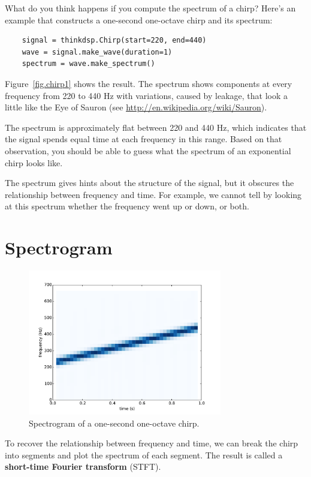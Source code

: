 \documentclass[12pt]{book}
\begin{document}
What do you think happens if you compute the spectrum of a chirp?
Here's an example that constructs a one-second one-octave chirp and
its spectrum:

\begin{verbatim}
    signal = thinkdsp.Chirp(start=220, end=440)
    wave = signal.make_wave(duration=1)
    spectrum = wave.make_spectrum()
\end{verbatim}

Figure~\ref{fig.chirp1} shows the result.  The spectrum shows
components at every frequency from 220 to 440 Hz with variations,
caused by leakage, that look a little like the Eye of Sauron
(see \url{http://en.wikipedia.org/wiki/Sauron}).

The spectrum is approximately flat between 220 and 440 Hz, which
indicates that the signal spends equal time at each frequency in this
range.  Based on that observation, you should be able to guess what
the spectrum of an exponential chirp looks like.

The spectrum gives hints about the structure of the signal,
but it obscures the relationship between frequency and time.
For example, we cannot tell by looking at this spectrum whether
the frequency went up or down, or both.


\section{Spectrogram}

\begin{figure}
\centerline{\includegraphics[height=2.5in]{figs/chirp2.pdf}}
\caption{Spectrogram of a one-second one-octave chirp.}
\label{fig.chirp2}
\end{figure}

To recover the relationship between frequency and time, we can break
the chirp into segments and plot the spectrum of each segment.  The
result is called a {\bf short-time Fourier transform} (STFT).
\end{document}
